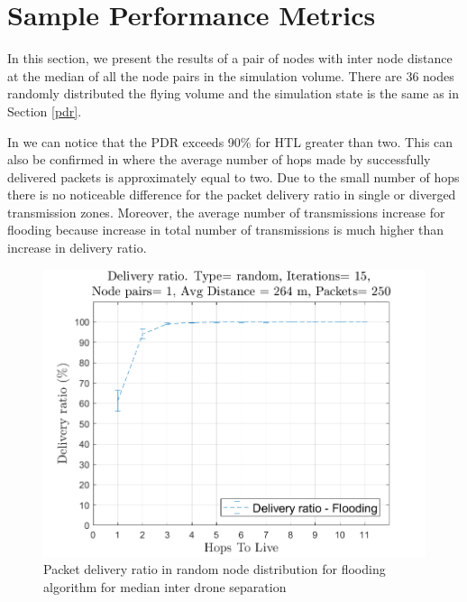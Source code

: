 \chapter{Sample Performance Metrics}

In this section, we present the results of a pair of nodes with inter node distance at the median of all the node pairs in the simulation volume. There are 36 nodes randomly distributed the flying volume and the simulation state is the same as in Section \ref{pdr}.


In  we can notice that the PDR exceeds 90\% for HTL greater than two. This can also be confirmed in  where the average number of hops made by successfully delivered packets is approximately equal to two. Due to the small number of hops there is no noticeable difference for the packet delivery ratio in single or diverged transmission zones. Moreover, the average number of transmissions increase for flooding because increase in total number of transmissions is much higher than increase in delivery ratio.

\begin{figure}
\centering
\includegraphics[width=1\textwidth]{ncsuthesis-0.6/Appendix-A/figs/median_fl_DR_random.png}
\caption{Packet delivery ratio in random node distribution for flooding algorithm for median inter drone separation}
\label{fig:med_fl_dr}
\end{figure}

